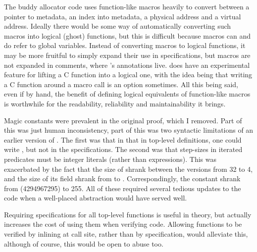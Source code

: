  The buddy allocator code
uses function-like macros heavily to convert between a pointer to metadata, an
index into metadata, a physical address and a virtual address. Ideally there
would be some way of automatically converting such macros into logical (ghost)
functions, but this is difficult because macros can and do refer to global
variables. Instead of converting macros to logical functions, it may be more
fruitful to simply expand their use in specifications, but macros are not
expanded in comments, where 's annotations live.
 does have an experimental feature for lifting a C function into a
logical one, with the idea being that writing a C function around a macro call
is an option sometimes. All this being said, even if by hand, the benefit of
defining logical equivalents of function-like macros is worthwhile for the
readability, reliability and maintainability it brings.

 Magic constants
were prevalent in the original proof, which I removed. Part of this was just
human inconsistency, part of this was two syntactic limitations of an earlier
version of . The first was that in that in top-level definitions, one
could write , but not in the specifications.
The second was that step-sizes in iterated predicates must be integer literals
(rather than  expressions). This was exacerbated by the fact
that the size of  shrank between the versions from 32
to 4, and the size of its  field shrank from  to
. Correspondingly, the constant  shrank from
 (4294967295) to 255. All of these required several tedious
updates to the code when a well-placed abstraction would have served well.

 Requiring specifications for all
top-level functions is useful in theory, but actually increases the cost of
using them when verifying code. Allowing functions to be verified by inlining
at call site, rather than by specification, would alleviate this, although of
course, this would be open to abuse too.


